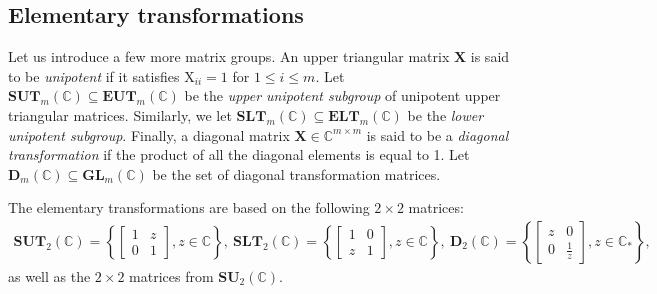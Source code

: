 \documentclass[final,onefignum,onetabnum]{siamart190516}
\newcommand{\matr}[1]{\boldsymbol{#1}}
\newcommand{\CC}{\mathbb{C}}
\newcommand{\matrelem}[1]{\mathrm{#1}}
\newcommand{\SUNN}[1]{\mathbf{SU}_{#1}}
\newcommand{\GL}{\mathbf{GL}}
\newcommand{\SUT}{\mathbf{SUT}}
\newcommand{\EUT}{\mathbf{EUT}}
\newcommand{\SLT}{\mathbf{SLT}}
\newcommand{\ELT}{\mathbf{ELT}}
\newcommand{\DT}{\mathbf{D}}
\begin{document}
\subsection{Elementary transformations}\label{subsec:elementary_trans}
Let us introduce a few more matrix groups. 
An upper triangular matrix $\matr{X}$ is said to be \emph{unipotent} if it satisfies $\matrelem{X}_{ii}=1$ for $1\leq i\leq m$. 
Let $\SUT_{m}(\CC)\subseteq \EUT_{m}(\CC) $ be the \emph{upper unipotent subgroup} of unipotent upper triangular matrices. 
Similarly,
we let $\SLT_{m}(\CC)\subseteq \ELT_{m}(\CC)$ be the \emph{lower unipotent subgroup}.
Finally, a diagonal matrix $\matr{X}\in\CC^{m\times m}$ is said to be a \emph{diagonal transformation} if the product of all the diagonal elements is equal to 1.
Let $\DT_{m}(\CC)\subseteq\GL_{m}(\CC)$ be the set of diagonal transformation matrices.

The elementary transformations are based on the following $2\times 2$ matrices:   
{\small
\begin{align*}
\SUT_{2}(\CC) = 
\left\{\begin{bmatrix}
1 &  z\\
0& 1
\end{bmatrix},
z\in\CC\right\},\ 
\SLT_{2}(\CC) = 
\left\{\begin{bmatrix}
1 &  0\\
z& 1
\end{bmatrix},
z\in\CC\right\},\  
 \DT_{2}(\CC) = 
\left\{\begin{bmatrix}
z &  0\\
0& \frac{1}{z}
\end{bmatrix},
z\in\CC_{*}\right\},
\end{align*}}
as well as the $2\times 2$ matrices from $\SUNN{2}(\CC)$. 
\end{document}
